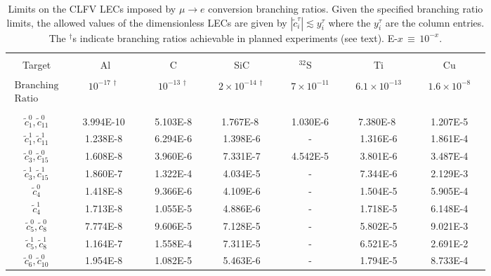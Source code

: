\documentclass{book}[12pt]
\begin{document}
\begin{table}
\label{table:limits}
\caption{Limits on the CLFV LECs imposed by $\mu \rightarrow e$ conversion branching ratios. 
Given the specified branching ratio limits, the allowed values of the dimensionless LECs are 
given by $|\tilde{c}_i^\tau| \lesssim y_i^\tau$ where the $y_i^\tau$ are the column entries.  The $^\dagger$s indicate  
branching ratios achievable in planned experiments (see text).   E-$x \, \equiv \,10^{-x}.$}
\begin{tabular}{|c|c|c|c|c|c|c|}
\hline
 & & & & & &  \\[-7.5pt]
Target  &~~~~~ Al~~~~~&~~~~~C~~~~~&~~~~SiC~~~~&~~~$^{32}$S~~~~~&~~~~~Ti~~~~~&~~~~~Cu~~~~~ \\[1.6pt]
\hline 
 & & & & & &  \\[-7.5pt]
$\begin{array}{l} \mathrm{Branching} \\  \mathrm{Ratio} \end{array}$ & $10^{-17 \, \dagger}$ & $10^{-13 \, \dagger}$ & $2 \times 10^{-14 \, \dagger}$ & $7 \times 10^{-11}$ \cite{BADERTSCHER1982406} &  $6.1 \times 10^{-13}$ \cite{wintz} & $1.6 \times 10^{-8}$ \cite{PhysRevLett.28.1469} \\
 & & & & & &  \\[-7.5pt]
\hline
 & & & & & &  \\[-5.5pt]
$\tilde{c}_1^0,\tilde{c}_{11}^0$ &~~3.994E-10~~ & ~~5.103E-8~~ & ~~1.767E-8 ~~& ~~1.030E-6~~ & ~~7.380E-8 ~~& ~~1.207E-5~~ \\
$\tilde{c}_1^1,\tilde{c}_{11}^1$ &1.238E-8 & 6.294E-6 & 1.398E-6 & - & 1.316E-6 & 1.861E-4 \\
$\tilde{c}_3^0,\tilde{c}_{15}^0$ &1.608E-8 & 3.960E-6 &7.331E-7 & 4.542E-5 & 3.801E-6 & 3.487E-4 \\
$\tilde{c}_3^1,\tilde{c}_{15}^1$ &1.860E-7 & 1.322E-4 & 4.034E-5 & - & 7.344E-6 & 2.129E-3 \\
$\tilde{c}_4^0$ & 1.418E-8 & 9.366E-6 & 4.109E-6 & - & 1.504E-5 & 5.905E-4 \\
$\tilde{c}_4^1$ & 1.713E-8 & 1.055E-5 & 4.886E-6 & - & 1.718E-5 & 6.148E-4 \\
$\tilde{c}_5^0,\tilde{c}_8^0$ &7.774E-8 & 9.606E-5 & 7.128E-5 & - & 5.802E-5 & 9.021E-3 \\
$\tilde{c}_5^1,\tilde{c}_8^1$ &1.164E-7 & 1.558E-4 & 7.311E-5 & - & 6.521E-5 & 2.691E-2 \\
$\tilde{c}_6^0,\tilde{c}_{10}^0$ & 1.954E-8 & 1.082E-5 & 5.463E-6 & - & 1.794E-5 & 8.733E-4 \\

\end{tabular}
\end{table}
\end{document}
